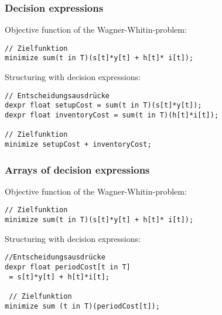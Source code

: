 \begin{frame}[fragile]
 \frametitle{Decision expressions}
 Objective function of the Wagner-Whitin-problem:
\begin{lstlisting}[numbers=none,basicstyle=\scriptsize\ttfamily]
// Zielfunktion
minimize sum(t in T)(s[t]*y[t] + h[t]* i[t]);
\end{lstlisting}

Structuring with decision expressions:
\begin{lstlisting}[numbers=none,basicstyle=\scriptsize\ttfamily]
// Entscheidungsausdrücke
dexpr float setupCost = sum(t in T)(s[t]*y[t]);
dexpr float inventoryCost = sum(t in T)(h[t]*i[t]);

// Zielfunktion
minimize setupCost + inventoryCost;
\end{lstlisting}
\end{frame}

\begin{frame}[fragile]
 \frametitle{Arrays of decision expressions}
 Objective function of the Wagner-Whitin-problem:
\begin{lstlisting}[numbers=none,basicstyle=\scriptsize\ttfamily]
// Zielfunktion
minimize sum(t in T)(s[t]*y[t] + h[t]* i[t]);
\end{lstlisting}

Structuring with decision expressions:
\begin{lstlisting}[numbers=none,basicstyle=\scriptsize\ttfamily]
//Entscheidungsausdrücke
dexpr float periodCost[t in T] 
 = s[t]*y[t] + h[t]*i[t];

 // Zielfunktion
minimize sum (t in T)(periodCost[t]);
\end{lstlisting}
\end{frame}

